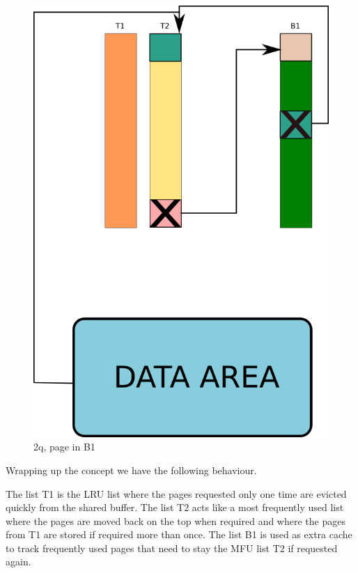 \begin{figure}[H]
\includegraphics[scale=0.4]{images/2q_04.png}

\caption{2q, page in B1}

\end{figure}

Wrapping up the concept we have the following behaviour.

The list T1 is the LRU list where the pages requested only one time are evicted quickly from the shared buffer. 
The list T2 acts like a most frequently used list where the pages are moved back on the top when required and where the pages from 
T1 are stored if required more than once. The list B1 is used as extra cache to track frequently used pages that need to stay the MFU list T2 if requested again.\newline


